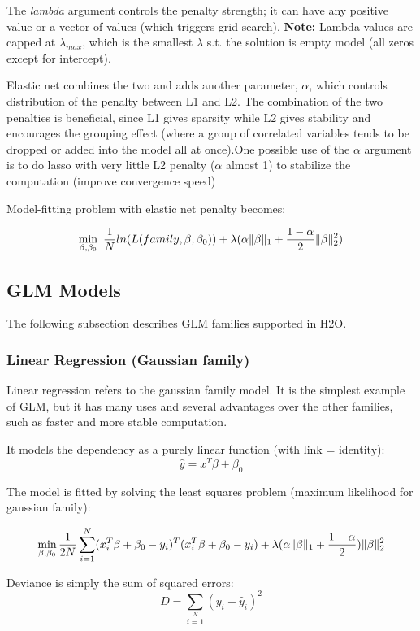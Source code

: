 \documentclass[11pt]{article}
\begin{document}
The \textit{lambda} argument controls the penalty strength; it can have any positive value or a vector of values (which triggers grid search).
\textbf{Note:} Lambda values are capped at $\lambda_{max}$, which is the smallest $\lambda$ s.t. the solution is empty model (all zeros except for intercept).

Elastic net combines the two and adds another parameter, $\alpha$, which controls distribution of the penalty between L1 and L2. The combination of the two penalties is beneficial, since L1 gives sparsity while L2 gives stability and encourages the grouping effect (where a group of correlated variables tends to be dropped or added into the model all at once).One possible use of the $\alpha$ argument is to do lasso with very little L2 penalty ($\alpha$ almost 1) to stabilize the computation (improve convergence speed)

Model-fitting problem with elastic net penalty becomes:

\[ \min\limits_{\beta,\beta_0}\ {{1\over{N}} ln(L(family,\beta,\beta_0))  + \lambda (\alpha \| \beta \|_1}  + {1- \alpha \over 2} \| \beta \|_2^2) \]


\subsection{GLM Models} 
The following subsection describes GLM families supported in H2O. 

\subsubsection{Linear Regression (Gaussian family) }
Linear regression refers to the gaussian family model. It is the simplest example of GLM, but it has many uses and several advantages over the other families, such as faster and more stable computation. 

It models the dependency as a purely linear function (with link = identity):
\[ \hat{y} = x^T\beta + \beta_0\]

The model is fitted by solving the least squares problem (maximum likelihood for gaussian family):

\[ \min\limits_{\beta,\beta_0} { {1 \over 2N}\sum\limits_{i=1}\limits^{N}(x_i^{T}\beta  + \beta_0- y_i)^T (x_i^{T}\beta + \beta_0 - y_i)  + \lambda (\alpha \|\beta \|_1 + {1-\alpha \over 2}) \| \beta \|_2^2} \]


Deviance is simply the sum of squared errors:
\[ D = \sum\limits_{i=1}\limits^{N}{(y_i - \hat{y}_i)^2} \]
\end{document}

